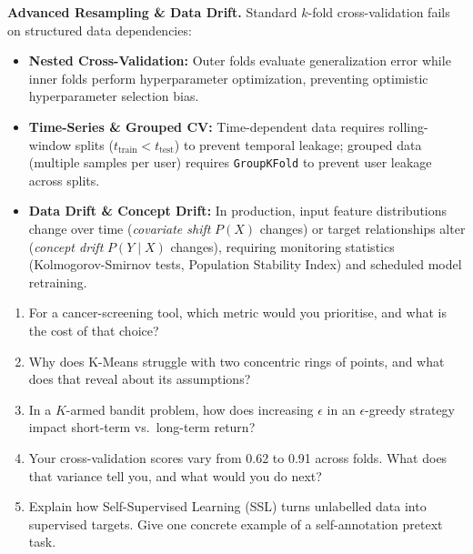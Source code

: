 \documentclass[11pt,a4paper]{article}
\begin{document}
	\textbf{Advanced Resampling \& Data Drift.} Standard $k$-fold cross-validation fails on structured data dependencies:
	\begin{itemize}[nosep]
		\item \textbf{Nested Cross-Validation:} Outer folds evaluate generalization error while inner folds perform hyperparameter optimization, preventing optimistic hyperparameter selection bias.
		\item \textbf{Time-Series \& Grouped CV:} Time-dependent data requires rolling-window splits ($t_{\text{train}} < t_{\text{test}}$) to prevent temporal leakage; grouped data (multiple samples per user) requires \texttt{GroupKFold} to prevent user leakage across splits.
		\item \textbf{Data Drift \& Concept Drift:} In production, input feature distributions change over time (\emph{covariate shift} $P(X)$ changes) or target relationships alter (\emph{concept drift} $P(Y \mid X)$ changes), requiring monitoring statistics (Kolmogorov-Smirnov tests, Population Stability Index) and scheduled model retraining.
	\end{itemize}
	
	\begin{checkpoint}
		\begin{enumerate}
			\item For a cancer-screening tool, which metric would you prioritise,
			and what is the cost of that choice?
			\item Why does K-Means struggle with two concentric rings of points,
			and what does that reveal about its assumptions?
			\item In a $K$-armed bandit problem, how does increasing $\epsilon$ in an $\epsilon$-greedy strategy impact short-term vs.\ long-term return?
			\item Your cross-validation scores vary from 0.62 to 0.91 across folds.
			What does that variance tell you, and what would you do next?
			\item Explain how Self-Supervised Learning (SSL) turns unlabelled data into supervised targets. Give one concrete example of a self-annotation pretext task.
		\end{enumerate}
	\end{checkpoint}
	
\end{document}
